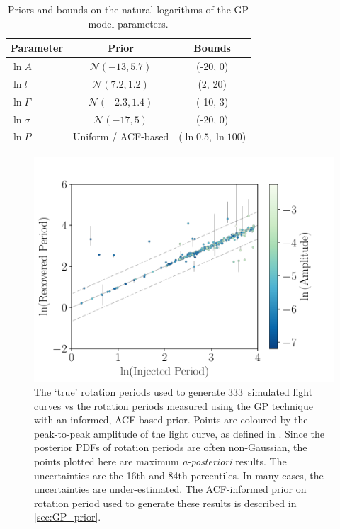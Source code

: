 \documentclass[a4paper,fleqn,usenatbib,useAMS]{mnras}
\newcommand{\naigrain}{333}
\begin{document}
\begin{table}
\begin{center}
\caption{Priors and bounds on the natural logarithms of the GP model
    parameters.}
\begin{tabular}{lcc}
Parameter & Prior & Bounds\\
    \hline
    $\ln A$ & $\mathcal N(-13, 5.7)$ & (-20, 0) \\
    $\ln l$ & $\mathcal N(7.2, 1.2)$ & (2, 20) \\
    $\ln \Gamma$ & $\mathcal N(-2.3, 1.4)$ & (-10, 3) \\
    $\ln \sigma$ & $\mathcal N(-17, 5)$ & (-20, 0) \\
    $\ln P $ & Uniform / ACF-based & ($\ln 0.5, \ln 100$) \\
\end{tabular}
\end{center}
\end{table}
\label{tab:priors}

\begin{figure}
\begin{center}
\includegraphics[width=6in, clip=true]{figures/comparison_acfprior_03_10.pdf}
\caption{The `true' rotation periods used to generate \naigrain\
simulated light curves vs the rotation periods measured using the GP
technique with an informed, ACF-based prior.
    Points are coloured by the peak-to-peak amplitude of the light curve, as
    defined in \citet{Aigrain2015}.
Since the posterior PDFs of rotation periods are often non-Gaussian,
    the points plotted here are maximum {\it a-posteriori} results.
The uncertainties are the 16th and 84th percentiles.
In many cases, the uncertainties are under-estimated.
The ACF-informed prior on rotation period used to generate these results is
    described in \textsection \ref{sec:GP_prior}.
    }
\label{fig:compare_mcmc_acfprior}
\end{center}
\end{figure}
\end{document}
